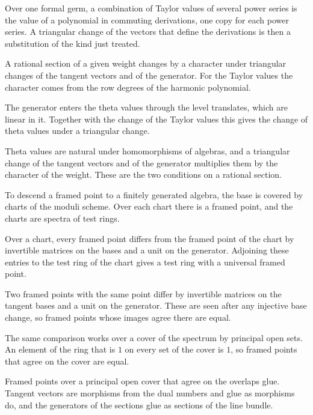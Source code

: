 Over one formal germ, a combination of Taylor values of several power series is the value of a polynomial in
commuting derivations, one copy for each power series. A triangular change of the vectors that define the derivations
is then a substitution of the kind just treated.

A rational section of a given weight changes by a character under triangular changes of the tangent vectors and of
the generator. For the Taylor values the character comes from the row degrees of the harmonic polynomial.

The generator enters the theta values through the level translates, which are linear in it. Together with the change
of the Taylor values this gives the change of theta values under a triangular change.

Theta values are natural under homomorphisms of algebras, and a triangular change of the tangent vectors and of the
generator multiplies them by the character of the weight. These are the two conditions on a rational section.

To descend a framed point to a finitely generated algebra, the base is covered by charts of the moduli scheme. Over
each chart there is a framed point, and the charts are spectra of test rings.

Over a chart, every framed point differs from the framed point of the chart by invertible matrices on the bases and a
unit on the generator. Adjoining these entries to the test ring of the chart gives a test ring with a universal framed
point.

Two framed points with the same point differ by invertible matrices on the tangent bases and a unit on the
generator. These are seen after any injective base change, so framed points whose images agree there are equal.

The same comparison works over a cover of the spectrum by principal open sets. An element of the ring that is $1$ on
every set of the cover is $1$, so framed points that agree on the cover are equal.

Framed points over a principal open cover that agree on the overlaps glue. Tangent vectors are morphisms from the
dual numbers and glue as morphisms do, and the generators of the sections glue as sections of the line bundle.

